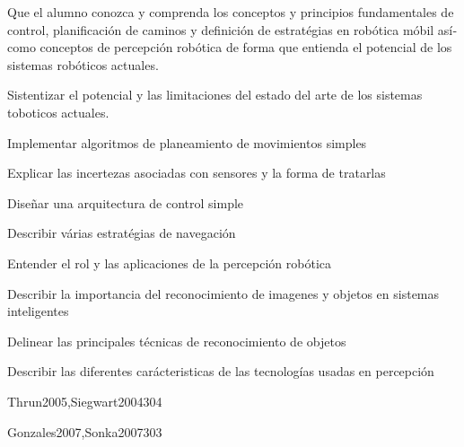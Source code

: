 \begin{syllabus}


\begin{justification}
Que el alumno conozca y comprenda los conceptos y principios fundamentales de control, planificación de caminos 
y definición de estratégias en robótica móbil así­ como conceptos de percepción robótica de forma que entienda 
el potencial de los sistemas robóticos actuales.
\end{justification}

\begin{goals}
\item Sistentizar el potencial y las limitaciones del estado del arte de los sistemas toboticos actuales.
\item Implementar algoritmos de planeamiento de movimientos simples
\item Explicar las incertezas asociadas con sensores y la forma de tratarlas
\item Diseñar una arquitectura de control simple
\item Describir várias estratégias de navegación
\item Entender el rol y las aplicaciones de la percepción robótica
\item Describir la importancia del reconocimiento de imagenes y objetos en sistemas inteligentes
\item Delinear las principales técnicas de reconocimiento de objetos
\item Describir las diferentes carácteristicas de las tecnologías usadas en percepción
\end{goals}

\begin{outcomes}
\end{outcomes}

\begin{unit}{\ISRoboticsDef}{Thrun2005,Siegwart2004}{30}{4}
   \ISRoboticsAllTopics
   \ISRoboticsAllObjectives
\end{unit}

\begin{unit}{\ISPerceptionDef}{Gonzales2007,Sonka2007}{30}{3}
   \ISPerceptionAllTopics
   \ISPerceptionAllObjectives
\end{unit}



\begin{coursebibliography}
\end{coursebibliography}

\end{syllabus}
